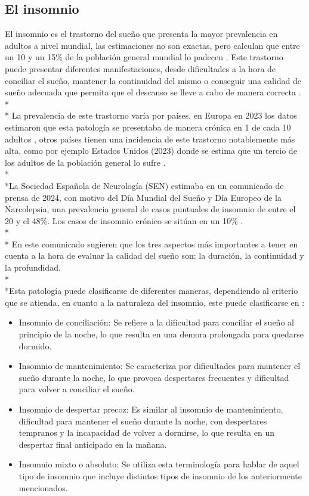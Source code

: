 \documentclass[a4paper,12pt,twoside]{memoir}
\begin{document}
\begin{itemize}
    \subsection{El insomnio}
    \text El insomnio es el trastorno del sueño que presenta la mayor prevalencia en adultos a nivel mundial, las estimaciones no son exactas, pero calculan que entre un 10 y un 15\% de la población general mundial lo padecen \cite{Contreras2021}. Este trastorno puede presentar diferentes manifestaciones, desde dificultades a la hora de conciliar el sueño, mantener la continuidad del mismo o conseguir una calidad de sueño adecuada que permita que el descanso se lleve a cabo de manera correcta \cite{kaur2023}. \\*\\* La prevalencia de este trastorno varía por países, en Europa en 2023 los datos estimaron que esta patología se presentaba de manera crónica en 1 de cada 10 adultos \cite{kaur2023}, otros países tienen una incidencia de este trastorno notablemente más alta, como por ejemplo Estados Unidos (2023) donde se estima que un tercio de los adultos de la población general lo sufre \cite{kaur2023}.\\*\\*La Sociedad Española de Neurología (SEN) estimaba en un comunicado de prensa de 2024, con motivo del Día  Mundial del Sueño y Día Europeo de la Narcolepsia, una prevalencia general de casos puntuales de insomnio de entre el 20 y el 48\%. Los casos de insomnio crónico se sitúan en un 10\% \cite{perez2024}. \\*\\* En este comunicado sugieren que los tres aspectos más importantes a tener en cuenta a la hora de evaluar la calidad del sueño son: la duración, la continuidad y la profundidad.\\*\\*Esta patología puede clasificarse de diferentes maneras, dependiendo al criterio que se atienda, en cuanto a la naturaleza del insomnio, este puede clasificarse en \cite{ferre2020}: 
\begin{itemize}
    \item Insomnio de conciliación: Se refiere a la dificultad para conciliar el sueño al principio de la noche, lo que resulta en una demora prolongada para quedarse dormido.
    \item Insomnio de mantenimiento: Se caracteriza por dificultades para mantener el sueño durante la noche, lo que provoca despertares frecuentes y dificultad para volver a conciliar el sueño.
    \item Insomnio de despertar precoz: Es similar al insomnio de mantenimiento, dificultad para mantener el sueño durante la noche, con despertares tempranos y la incapacidad de volver a dormirse, lo que resulta en un despertar final anticipado en la mañana.
    \item Insomnio mixto o absoluto: Se utiliza esta terminología para hablar de aquel tipo de insomnio que incluye distintos tipos de insomnio de los anteriormente mencionados.
\end{itemize}


\end{itemize}
\end{document}
